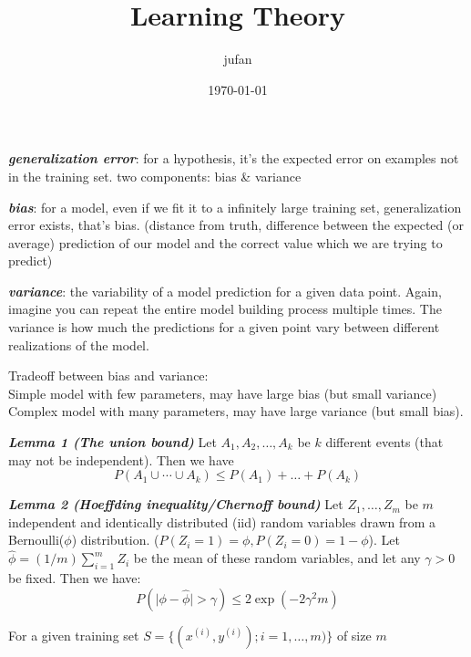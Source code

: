 \documentclass{article}
\begin{document}
\title{Learning Theory}\author{jufan}\date{\today}
\maketitle
\tableofcontents

\emph{\textbf{generalization error}}: for a hypothesis, it's the expected error on examples not in the training set. two components: bias \& variance

\emph{\textbf{bias}}: for a model, even if we fit it to a infinitely large training set, generalization error exists, that's bias. (distance from truth, difference between the expected (or average) prediction of our model and the correct value which we are trying to predict)

\emph{\textbf{variance}}:  the variability of a model prediction for a given data point. Again, imagine you can repeat the entire model building process multiple times. The variance is how much the predictions for a given point vary between different realizations of the model.

Tradeoff between bias and variance: \\
Simple model with few parameters, may have large bias (but small variance)
Complex model with many parameters, may have large variance (but small bias).

\emph{\textbf{Lemma 1 (The union bound)}} Let $A_1,A_2,\ldots,A_k$ be $k$ different events (that may not be independent). Then we have
\begin{equation*}
P(A_1\cup\cdots\cup A_k)\leq P(A_1)+\ldots+P(A_k)
\end{equation*}

\emph{\textbf{Lemma 2 (Hoeffding inequality/Chernoff bound)}} Let $Z_1,\ldots,Z_m$ be $m$ independent and identically distributed (iid) random variables drawn from a Bernoulli($\phi$) distribution. ($P(Z_i=1)=\phi,P(Z_i=0)=1-\phi$).
Let $\hat{\phi}=(1/m)\sum\nolimits_{i=1}^mZ_i$ be the mean of these random variables, and let any $\gamma>0$ be fixed. Then we have:
\begin{equation*}
P(\lvert\phi-\hat{\phi}\rvert>\gamma)\leq2\exp(-2\gamma^2m)
\end{equation*}

For a given training set $S=\{(x^{(i)},y^{(i)});i=1,\ldots,m)\}$ of size $m$ 
\end{document}
